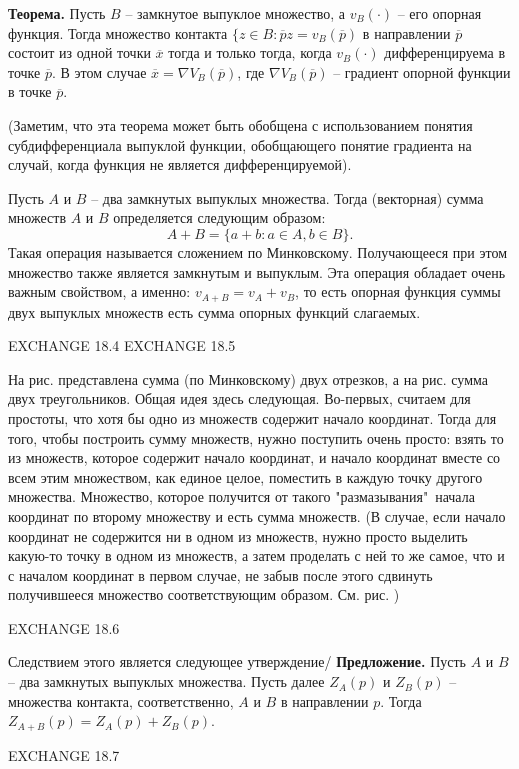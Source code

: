 \textbf{Теорема.} Пусть $B$ -- замкнутое выпуклое множество, а $v_B(\cdot)$ -- его
опорная функция. Тогда множество контакта $\{z\in B: \overline{p}z=v_B(\overline{p})$
в направлении $\overline{p}$ состоит из одной точки $\overline{x}$ тогда и только тогда,
когда $v_B(\cdot)$ дифференцируема в точке $\overline{p}$. В этом случае
$\overline{x}=\nabla V_B(\overline{p})$, где $\nabla V_B(\overline{p})$ -- градиент
опорной функции в точке $\overline{p}$.

(Заметим, что эта теорема может быть обобщена с использованием понятия субдифференциала
выпуклой функции, обобщающего понятие градиента на случай, когда функция не является дифференцируемой).

Пусть $A$ и $B$ -- два замкнутых выпуклых множества. Тогда (векторная) сумма множеств
$A$ и $B$ определяется следующим образом:
$$A+B=\{a+b: a\in A, b\in B\}.$$
Такая операция называется сложением по Минковскому. Получающееся при этом множество
также является замкнутым и выпуклым. Эта операция обладает очень важным свойством, а именно:
$v_{A+B}=v_A+v_B$, то есть опорная функция суммы двух выпуклых множеств есть сумма опорных
функций слагаемых.

EXCHANGE 18.4
EXCHANGE 18.5

На рис.   представлена сумма (по Минковскому) двух отрезков, а на рис.     сумма двух треугольников.
Общая идея здесь следующая. Во-первых, считаем для простоты, что хотя бы одно из множеств
содержит начало координат. Тогда для того, чтобы построить сумму множеств, нужно поступить
очень просто: взять то из множеств, которое содержит начало координат, и начало координат
вместе со всем этим множеством, как единое целое, поместить в каждую точку другого множества.
Множество, которое получится от такого "размазывания"\, начала координат по второму множеству
и есть сумма множеств. (В случае, если начало координат не содержится ни в одном из множеств,
нужно просто выделить какую-то точку в одном из множеств, а затем проделать с ней то же
самое, что и с началом координат в первом случае, не забыв после этого сдвинуть получившееся множество
соответствующим образом. См. рис.    )

EXCHANGE 18.6


Следствием этого является следующее утверждение/
\textbf{Предложение.} Пусть $A$ и $B$ -- два замкнутых выпуклых множества. Пусть далее
$Z_A(p)$ и $Z_B(p)$ -- множества контакта, соответственно, $A$ и $B$ в направлении $p$.
Тогда $Z_{A+B}(p)=Z_A(p)+Z_B(p)$.


EXCHANGE 18.7


